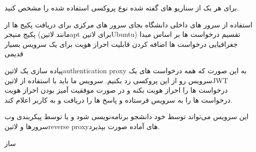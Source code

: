 \documentclass{../assignment}
\begin{document}

برای هر یک از سناریو های گفته شده نوع پروکسی استفاده شده را مشخص کنید.

 استفاده از سرور های داخلی دانشگاه بجای سرور های مرکزی برای دریافت پکیج ها از پکیج منیجر (مانند ‌لاتین{apt} برای ‌لاتین{Ubuntu})
 تقسیم درخواست ها بر اساس مبدا جغرافیایی درخواست ها
 اضافه کردن قابلیت احراز هویت برای یک سرویس بسیار قدیمی



پیاده سازی یک ‌لاتین{authentication proxy} به این صورت که همه درخواست های یک سرویس رو از این پروکسی رد بکنیم.
سرویس ما باید با استفاده از ‌لاتین{JWT} درخواست ها را احراز هویت بکنه و در صورت موفقیت آمیز بودن احراز هویت درخواست ها را به سرویس فرستاده و پاسخ ها را دریافت و به کاربر اعلام کند.

این سرویس می‌تواند توسط خود دانشجو برنامه‌نویسی شود و یا توسط پیکربندی وب سرورها و ‌لاتین{reverse proxy}های آماده صورت بپذیرد.

‌ساز
\end{document}

